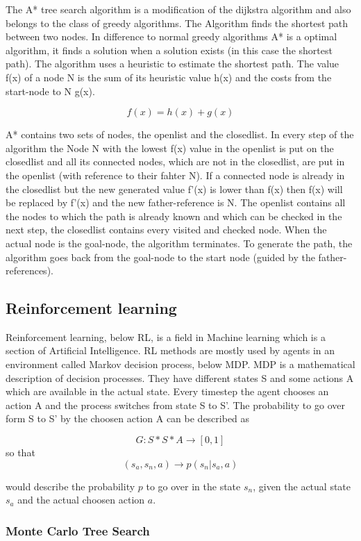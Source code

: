 The A* tree search algorithm is a modification of the dijkstra algorithm and also belongs to the class of greedy algorithms. The Algorithm finds the shortest path between two nodes. In difference to normal greedy algorithms A* is a optimal algorithm, it finds a solution when a solution exists (in this case the shortest path). The algorithm uses a heuristic to estimate the shortest path. The value f(x) of a node N is the sum of its heuristic value h(x) and the costs from the start-node to N g(x).

\[
	f(x)=h(x)+g(x)
\]   

A* contains two sets of nodes, the openlist and the closedlist. In every step of the algorithm the Node N with the lowest f(x) value in the openlist is put on the closedlist and all its connected nodes, which are not in the closedlist, are put in the openlist (with reference to their fahter N). If a connected node is already in the closedlist but the new generated value f'(x) is lower than f(x) then f(x) will be replaced by f'(x) and the new father-reference is N. The openlist contains all the nodes to which the path is already known and which can be checked in the next step, the closedlist contains every visited and checked node. When the actual node is the goal-node, the algorithm terminates. To generate the path, the algorithm goes back from the goal-node to the start node (guided by the father-references). 

\subsection{Reinforcement learning} 
 
Reinforcement learning, below RL, is a field in Machine learning which is a section of Artificial Intelligence. RL methods are mostly used by agents in an environment called Markov decision process, below MDP. MDP is a mathematical description of decision processes. They have different states S and some actions A which are available in the actual state. Every timestep the agent chooses an action A and the process switches from state S to S'. The probability to go over form S to S' by the choosen action A can be described as

\[
	G: S*S*A \rightarrow [0,1] 
\] 
	so that
\[
	(s_a, s_n, a) \rightarrow p(s_n|s_a, a)
\]

would describe the probability $p$ to go over in the state $s_n$, given the actual state $s_a$ and the actual choosen action $a$.

\subsubsection{Monte Carlo Tree Search} 

